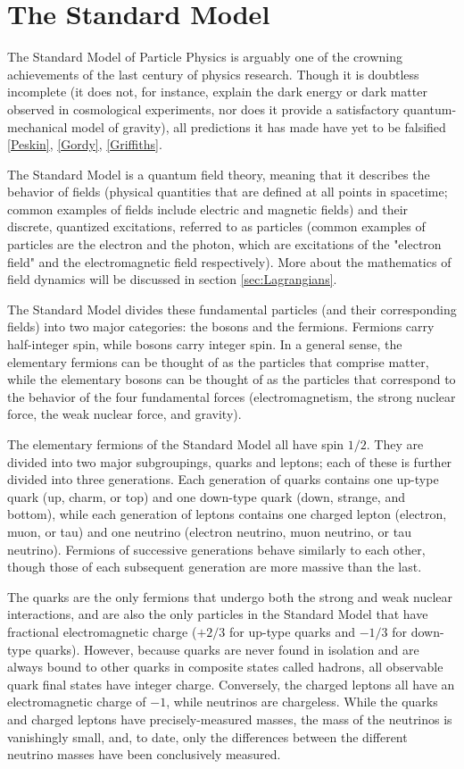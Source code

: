 \usepackage{ amssymb }

\section{The Standard Model} \label{sec:SM} 

The Standard Model of Particle Physics is arguably one of the crowning achievements of the last century of physics research. Though it is doubtless incomplete (it does not, for instance, explain the dark energy or dark matter observed in cosmological experiments, nor does it provide a satisfactory quantum-mechanical model of gravity), all predictions it has made have yet to be falsified \ref{Peskin}, \ref{Gordy}, \ref{Griffiths}.

The Standard Model is a quantum field theory, meaning that it describes the behavior of fields (physical quantities that are defined at all points in spacetime; common examples of fields include electric and magnetic fields) and their discrete, quantized excitations, referred to as particles (common examples of particles are the electron and the photon, which are excitations of the "electron field" and the electromagnetic field respectively). More about the mathematics of field dynamics will be discussed in section \ref{sec:Lagrangians}.

The Standard Model divides these fundamental particles (and their corresponding fields) into two major categories: the bosons and the fermions. Fermions carry half-integer spin, while bosons carry integer spin. In a general sense, the elementary fermions can be thought of as the particles that comprise matter, while the elementary bosons can be thought of as the particles that correspond to the behavior of the four fundamental forces (electromagnetism, the strong nuclear force, the weak nuclear force, and gravity).

The elementary fermions of the Standard Model all have spin $1/2$. They are divided into two major subgroupings, quarks and leptons; each of these is further divided into three generations. Each generation of quarks contains one up-type quark (up, charm, or top) and one down-type quark (down, strange, and bottom), while each generation of leptons contains one charged lepton (electron, muon, or tau) and one neutrino (electron neutrino, muon neutrino, or tau neutrino). Fermions of successive generations behave similarly to each other, though those of each subsequent generation are more massive than the last.

The quarks are the only fermions that undergo both the strong and weak nuclear interactions, and are also the only particles in the Standard Model that have fractional electromagnetic charge ($+2/3$ for up-type quarks and $-1/3$ for down-type quarks). However, because quarks are never found in isolation and are always bound to other quarks in composite states called hadrons, all observable quark final states have integer charge. Conversely, the charged leptons all have an electromagnetic charge of $-1$, while neutrinos are chargeless. While the quarks and charged leptons have precisely-measured masses, the mass of the neutrinos is vanishingly small, and, to date, only the differences between the different neutrino masses have been conclusively measured.

